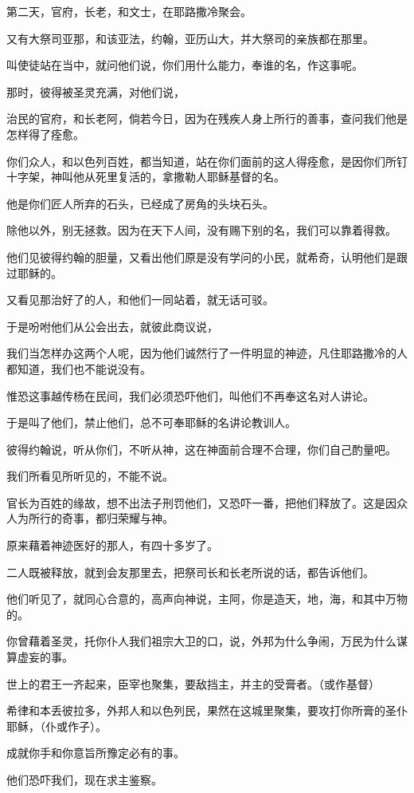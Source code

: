 \documentclass[12pt,oneside]{book}
\begin{document}
第二天，官府，长老，和文士，在耶路撒冷聚会。

又有大祭司亚那，和该亚法，约翰，亚历山大，并大祭司的亲族都在那里。

叫使徒站在当中，就问他们说，你们用什么能力，奉谁的名，作这事呢。

那时，彼得被圣灵充满，对他们说，

治民的官府，和长老阿，倘若今日，因为在残疾人身上所行的善事，查问我们他是怎样得了痊愈。

你们众人，和以色列百姓，都当知道，站在你们面前的这人得痊愈，是因你们所钉十字架，神叫他从死里复活的，拿撒勒人耶稣基督的名。

他是你们匠人所弃的石头，已经成了房角的头块石头。

除他以外，别无拯救。因为在天下人间，没有赐下别的名，我们可以靠着得救。

他们见彼得约翰的胆量，又看出他们原是没有学问的小民，就希奇，认明他们是跟过耶稣的。

又看见那治好了的人，和他们一同站着，就无话可驳。

于是吩咐他们从公会出去，就彼此商议说，

我们当怎样办这两个人呢，因为他们诚然行了一件明显的神迹，凡住耶路撒冷的人都知道，我们也不能说没有。

惟恐这事越传杨在民间，我们必须恐吓他们，叫他们不再奉这名对人讲论。

于是叫了他们，禁止他们，总不可奉耶稣的名讲论教训人。

彼得约翰说，听从你们，不听从神，这在神面前合理不合理，你们自己酌量吧。

我们所看见所听见的，不能不说。

官长为百姓的缘故，想不出法子刑罚他们，又恐吓一番，把他们释放了。这是因众人为所行的奇事，都归荣耀与神。

原来藉着神迹医好的那人，有四十多岁了。

二人既被释放，就到会友那里去，把祭司长和长老所说的话，都告诉他们。

他们听见了，就同心合意的，高声向神说，主阿，你是造天，地，海，和其中万物的。

你曾藉着圣灵，托你仆人我们祖宗大卫的口，说，外邦为什么争闹，万民为什么谋算虚妄的事。

世上的君王一齐起来，臣宰也聚集，要敌挡主，并主的受膏者。（或作基督）

希律和本丢彼拉多，外邦人和以色列民，果然在这城里聚集，要攻打你所膏的圣仆耶稣，（仆或作子）。

成就你手和你意旨所豫定必有的事。

他们恐吓我们，现在求主鉴察。
\end{document}
